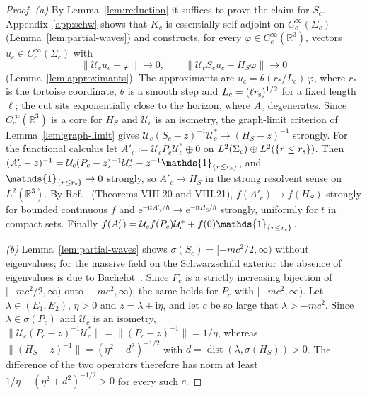 \documentclass[%
 aip,
 jmp,
 amsmath,amssymb,
 reprint, onecolumn
]{revtex4-1}
\theoremstyle{definition}
\theoremstyle{remark}
\newcommand{\R}{\mathbb{R}}
\newcommand{\one}{\mathds{1}}
\newcommand{\rmi}{\mathrm{i}}
\newcommand{\rme}{\mathrm{e}}
\begin{document}
\begin{proof}
\emph{(a)} By Lemma~\ref{lem:reduction} it suffices to prove the claim
for $S_c$. Appendix~\ref{app:schw} shows that $K_c$ is essentially
self-adjoint on $C_c^\infty(\Sigma_c)$ (Lemma~\ref{lem:partial-waves})
and constructs, for every $\varphi\in C_c^\infty(\R^3)$, vectors
$u_c\in C_c^\infty(\Sigma_c)$ with
\begin{equation}\label{eq:graph-limit}
\|\mathcal{U}_cu_c-\varphi\|\to0,\qquad
\|\mathcal{U}_cS_cu_c-H_S\varphi\|\to0
\end{equation}
(Lemma~\ref{lem:approximants}). The approximants are
$u_c=\theta(r_*/L_c)\,\varphi$, where $r_*$ is the tortoise coordinate,
$\theta$ is a smooth step and $L_c=(\ell r_{\rm s})^{1/2}$ for a fixed
length $\ell$; the cut sits exponentially close to the horizon, where
$A_c$ degenerates. Since
$C_c^\infty(\R^3)$ is a core for $H_S$ and $\mathcal{U}_c$ is an isometry,
the graph-limit criterion of Lemma~\ref{lem:graph-limit} gives
$\mathcal{U}_c(S_c-z)^{-1}\mathcal{U}_c^*\to(H_S-z)^{-1}$ strongly. For
the functional calculus let $A'_c:=\mathcal{U}_cP_c\mathcal{U}_c^*\oplus0$
on $L^2(\Sigma_c)\oplus L^2(\{r\leq r_{\rm s}\})$. Then
$(A'_c-z)^{-1}=\mathcal{U}_c(P_c-z)^{-1}\mathcal{U}_c^*-z^{-1}
\one_{\{r\leq r_{\rm s}\}}$, and $\one_{\{r\leq r_{\rm s}\}}\to0$
strongly, so $A'_c\to H_S$ in the strong resolvent sense on
$L^2(\R^3)$. By Ref.~ (Theorems VIII.20 and
VIII.21), $f(A'_c)\to f(H_S)$ strongly for bounded continuous $f$ and
$\rme^{-\rmi tA'_c/\hbar}\to\rme^{-\rmi tH_S/\hbar}$ strongly, uniformly
for $t$ in compact sets. Finally $f(A'_c)=\mathcal{U}_cf(P_c)
\mathcal{U}_c^*+f(0)\one_{\{r\leq r_{\rm s}\}}$.

\emph{(b)} Lemma~\ref{lem:partial-waves} shows $\sigma(S_c)=
[-mc^2/2,\infty)$ without eigenvalues; for the massive field on the
Schwarzschild exterior the absence of eigenvalues is due to
Bachelot~\cite{Bachelot1994}. Since $F_c$ is a strictly
increasing bijection of $[-mc^2/2,\infty)$ onto $[-mc^2,\infty)$,
the same holds for $P_c$ with $[-mc^2,\infty)$. Let
$\lambda\in(E_1,E_2)$, $\eta>0$ and $z=\lambda+\rmi\eta$, and let $c$ be
so large that $\lambda>-mc^2$. Since
$\lambda\in\sigma(P_c)$ and $\mathcal{U}_c$ is an isometry,
$\|\mathcal{U}_c(P_c-z)^{-1}\mathcal{U}_c^*\|=\|(P_c-z)^{-1}\|=1/\eta$,
whereas $\|(H_S-z)^{-1}\|=(\eta^2+d^2)^{-1/2}$ with $d=
\operatorname{dist}(\lambda,\sigma(H_S))>0$. The difference of the two
operators therefore has norm at least $1/\eta-(\eta^2+d^2)^{-1/2}>0$ for
every such $c$.


\end{proof}
\end{document}
